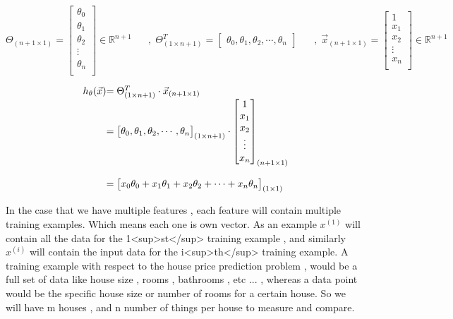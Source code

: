 \[
	\Theta_{(n+1 \times 1)}
	=
	\begin{bmatrix}
	\theta_0 \\
	\theta_1 \\
	\theta_2 \\
	\vdots \\
	\theta_n \\
	\end{bmatrix}
	\in \mathbb{R}^{n + 1}
	\; \; \; \; \; \; , \;
	\Theta_{(1 \times n+1)}^{T}
	=
	\begin{bmatrix}
		\theta_0 ,
		\theta_1 ,
		\theta_2 ,
		\cdots ,
		\theta_n
	\end{bmatrix} 
	\; \; \; \; \; \; , \;
	\vec{x}_{(n+1 \times 1)}
	=
	\begin{bmatrix}
		1 \\
		x_1 \\
		x_2 \\
		\vdots \\
		x_n \\
	\end{bmatrix}
	\in \mathbb{R}^{n + 1}
\]

\[
\begin{array}{ l@{} l@{} l@{}}
h_\theta (\vec{x})
	& = \Theta_{(1 \times n+1)}^{T} \cdot \vec{x}_{(n+1 \times 1)}
\\
& =
	\begin{bmatrix}
	\theta_0 ,
	\theta_1 ,
	\theta_2 ,
	\cdots ,
	\theta_n
	\end{bmatrix}_{(1 \times n+1)}
	\cdot
	\begin{bmatrix}
		1 \\
		x_1 \\
		x_2 \\
		\vdots \\
		x_n \\
	\end{bmatrix}_{(n+1 \times 1)}
\\ \\
& =
\begin{bmatrix}
	x_0\theta_0 +
	x_1\theta_1 +
	x_2\theta_2 +
	\cdots +
	x_n\theta_n \\
\end{bmatrix}_{(1 \times 1)}
\end{array}
\]


In the case that we have multiple features , each feature will contain multiple
training examples.  Which means each one is own vector. As an example $x^{(1)}$
will contain all the data for the 1<sup>st</sup> training example , and similarly
$x^{(i)}$ will contain the input data for the i<sup>th</sup> training example.
A training example with respect to the house price prediction problem , would be
a full set of data like house size , rooms , bathrooms , etc ... , whereas a
data point would be the specific house size or number of rooms for a certain
house. So we will have m houses , and n number of things per house to measure
and compare.

